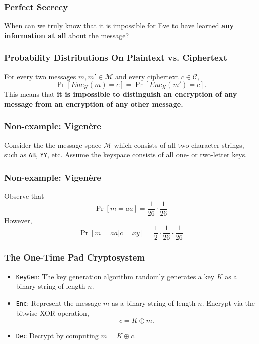 \documentclass{beamer}
\newcommand{\<}{\langle}
\renewcommand{\>}{\rangle}
\begin{document}
\begin{frame}
\frametitle{Perfect Secrecy}

When can we truly know that it is impossible for Eve to have learned \textbf{any information at all} about the message?
\end{frame}


\begin{frame}
\frametitle{Probability Distributions On Plaintext vs. Ciphertext}

For every two messages $m, m'\in\mathcal M$ and every ciphertext $c\in \mathcal C$,
\[
\Pr[Enc_K(m) = c] = \Pr[Enc_K(m') = c].
\]
This means that \textbf{it is impossible to distinguish an encryption of any message from an encryption of any other message.}
\end{frame}


\begin{frame}[fragile]
\frametitle{Non-example: Vigen\`{e}re}

Consider the the message space $\mathcal M$ which consists of all two-character strings, such as \verb|AB|, \verb|YY|, etc. Assume the keyspace consists of all one- or two-letter keys. \newline
\end{frame}




\begin{frame}
\frametitle{Non-example: Vigen\`{e}re}

Observe that
\[
\Pr[m = aa] = \frac{1}{26}\cdot \frac{1}{26}
\]
However,
\[
\Pr[m = aa | c = xy] = \frac{1}{2}\cdot\frac{1}{26}\cdot\frac{1}{26}
\]
\end{frame}



\begin{frame}[fragile]
\frametitle{The One-Time Pad Cryptosystem}

\begin{itemize}
\item \verb|KeyGen|: The key generation algorithm randomly generates a key $K$ as a binary string of length $n$.
\item \verb|Enc|: Represent the message $m$ as a binary string of length $n$. Encrypt via the bitwise XOR operation,
\[
c = K \oplus m.
\]
\item \verb|Dec| Decrypt by computing $m = K \oplus c$.
\end{itemize}
\end{frame}
\end{document}
